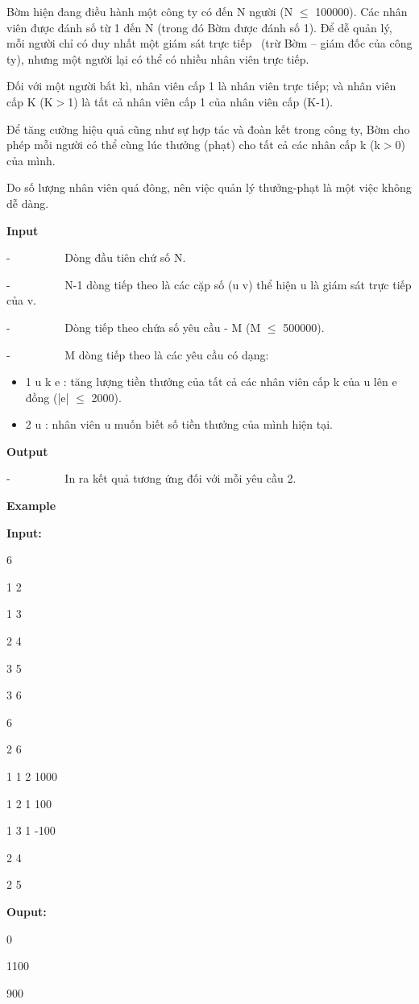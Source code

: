 



   Bờm hiện đang điều hành một công ty có đến   N   người   (N  $\le$  100000).   Các nhân viên được đánh số từ 1 đến   N   (trong đó Bờm được đánh số 1). Để dễ quản lý, mỗi người chỉ có duy nhất một giám sát trực tiếp  (trừ Bờm – giám đốc của công ty), nhưng một người lại có thể có nhiều nhân viên trực tiếp.  

   Đối với một người bất kì, nhân viên cấp 1 là nhân viên trực tiếp; và nhân viên cấp   K (K$>$1)   là tất cả nhân viên cấp 1 của nhân viên cấp   (K-1).

   Để tăng cường hiệu quả cũng như sự hợp tác và đoàn kết trong công ty, Bờm cho phép mỗi người có thể cùng lúc thưởng (phạt) cho tất cả các nhân cấp   k (k$>$0)   của mình.  

   Do số lượng nhân viên quá đông, nên việc quản lý thưởng-phạt là một việc không dễ dàng.  

\textbf{    Input   }

   -          Dòng đầu tiên chứ số N.  

   -          N-1 dòng tiếp theo là các cặp số   (u v)   thể hiện u là giám sát trực tiếp của v.  

   -          Dòng tiếp theo chứa số yêu cầu -   M (M $\le$ 500000).

   -          M dòng tiếp theo là các yêu cầu có dạng:  
\begin{itemize}
	\item 1 u k e    : tăng lượng tiền thưởng của tất cả các nhân viên cấp k của u lên e đồng    (|e|  $\le$  2000).
	\item 2 u    : nhân viên u muốn biết số tiền thưởng của mình hiện tại.   
\end{itemize}

\textbf{    Output   }

   -          In ra kết quả tương ứng đối với mỗi yêu cầu 2.  

\textbf{    Example   }

\textbf{    Input:   }

   6  

   1 2  

   1 3  

   2 4  

   3 5  

   3 6  

   6  

   2 6  

   1 1 2 1000  

   1 2 1 100  

   1 3 1 -100  

   2 4  

   2 5  



\textbf{    Ouput:   }

   0  

   1100  

   900  

\textbf{}

